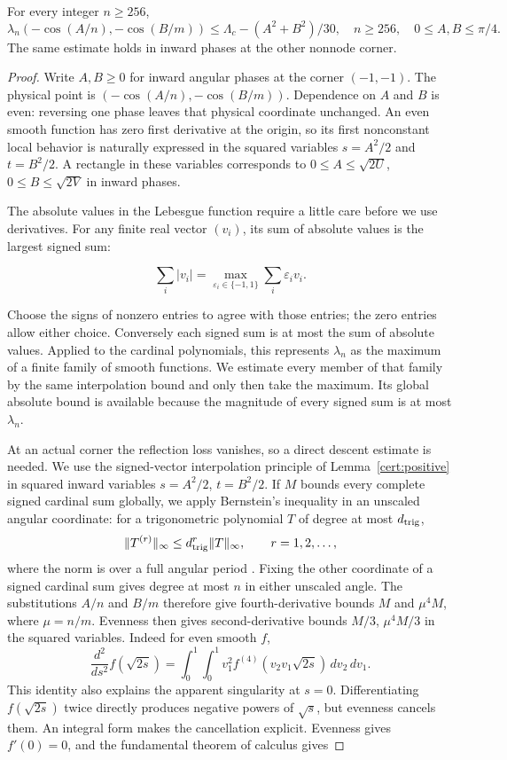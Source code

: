 \begin{lemma}\label{ul:corner-lemma}
For every integer $n\geq256$,
\begin{equation}\label{ul:corner256}
 \lambda_n(-\cos(A/n),-\cos(B/m))
 \leq\Lambda_c-(A^2+B^2)/30,
 \quad n\geq256,\quad 0\leq A,B\leq\pi/4.
\end{equation}
The same estimate holds in inward phases at the other nonnode corner.
\end{lemma}
\begin{proof}
Write $A,B\geq0$ for inward angular phases at the corner $(-1,-1)$.
The physical point is $(-\cos(A/n),-\cos(B/m))$.  Dependence on
$A$ and $B$ is even: reversing one phase leaves that physical
coordinate unchanged.  An even smooth function has zero first
derivative at the origin, so its first nonconstant local behavior
is naturally expressed in the squared variables $s=A^2/2$ and
$t=B^2/2$.  A rectangle in these variables corresponds to
$0\leq A\leq\sqrt{2U}$, $0\leq B\leq\sqrt{2V}$ in inward
phases.

The absolute values in the Lebesgue function require a little care
before we use derivatives.  For any finite real vector
$(v_i)$, its sum of absolute values is the largest signed sum:

\[
 \sum_i|v_i|=\max_{\varepsilon_i\in\{-1,1\}}
                   \sum_i\varepsilon_iv_i.
\]

Choose the signs of nonzero entries to agree with those entries;
the zero entries allow either choice.  Conversely each signed sum
is at most the sum of absolute values.  Applied to the cardinal
polynomials, this represents $\lambda_n$ as the maximum of a
finite family of smooth functions.  We estimate every member of
that family by the same interpolation bound and only then take
the maximum.  Its global absolute bound is available because
the magnitude of every signed sum is at most $\lambda_n$.

At an actual corner the reflection loss vanishes, so a direct descent
estimate is needed.  We use the signed-vector interpolation principle
of Lemma~\ref{cert:positive} in squared inward variables
$s=A^2/2$, $t=B^2/2$.  If $M$ bounds every complete signed cardinal
sum globally, we apply Bernstein's inequality in an unscaled angular
coordinate: for a trigonometric polynomial $T$ of degree at most $d_{\rm trig}$,
\[
 \|T^{(r)}\|_\infty\leq d_{\rm trig}^r\|T\|_\infty,\qquad r=1,2,\ldots,
\]
where the norm is over a full angular period \cite{Boas1954}.
Fixing the other coordinate of a signed cardinal sum gives degree
at most $n$ in either unscaled angle. The substitutions $A/n$ and
$B/m$ therefore give fourth-derivative bounds $M$ and $\mu^4M$,
where $\mu=n/m$. Evenness then gives second-derivative bounds
$M/3$, $\mu^4M/3$ in the squared variables.
Indeed for even smooth $f$,
\[
 \frac{d^2}{ds^2}f(\sqrt{2s})
   =\int_0^1\!\int_0^1v_1^2f^{(4)}(v_2v_1\sqrt{2s})\,dv_2\,dv_1.
\]
This identity also explains the apparent singularity at $s=0$.
Differentiating $f(\sqrt{2s})$ twice directly produces negative
powers of $\sqrt{s}$, but evenness cancels them.  An integral
form makes the cancellation explicit.  Evenness gives $f'(0)=0$,
and the fundamental theorem of calculus gives


\end{proof}
